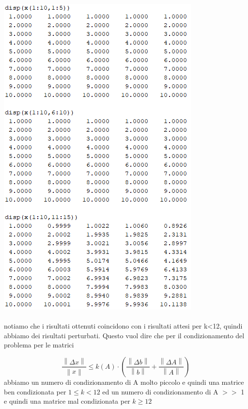 \includegraphics[width=.65\linewidth]{img/tabella10.png}\\~\\
notiamo che i risultati ottenuti coincidono con i risultati attesi per k<12, quindi abbiamo dei risultati perturbati.\newline
Questo vuol dire che per il condizionamento del problema per le matrici

\begin{equation}
	\frac{\left \| \Delta x \right \|}{\left \| x \right \|} \leq k(A)\cdot \left ( \frac{\left \| \Delta b \right \|}{\left \| b \right \|} + \frac{\left \| \Delta A \right \|}{\left \| A \right \|}\right )
\end{equation}
abbiamo un numero di condizionamento di A molto piccolo e quindi una matrice ben condizionata per $1 \leq k<12$ ed un numero di condizionamento di A $>>$ 1 e quindi una matrice mal condizionata per $k \geq 12$